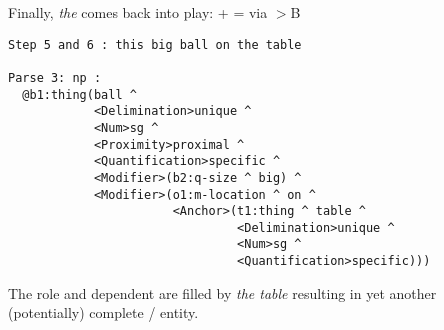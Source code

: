 Finally, \emph{the} comes back into play:   +   =  via \ensuremath{>}B
\begin{verbatim}
Step 5 and 6 : this big ball on the table  

Parse 3: np : 
  @b1:thing(ball ^ 
            <Delimination>unique ^ 
            <Num>sg ^ 
            <Proximity>proximal ^ 
            <Quantification>specific ^ 
            <Modifier>(b2:q-size ^ big) ^ 
            <Modifier>(o1:m-location ^ on ^ 
                       <Anchor>(t1:thing ^ table ^ 
                                <Delimination>unique ^ 
                                <Num>sg ^ 
                                <Quantification>specific)))
\end{verbatim}
The  role and  dependent are filled by \emph{the table} resulting in yet another (potentially) complete  / entity.
